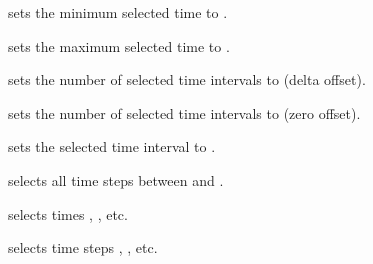  {
sets the minimum selected time to .
}

 {
sets the maximum selected time to .
}

 {
sets the number of selected time intervals to  (delta
offset).
}

 {
sets the number of selected time intervals to  (zero
offset).
}

 {
sets the selected time interval to .
}

 {
selects all time steps between  and .
}

\ifx\PROGRAM\ALGEBRA \newpage \fi %
 {
selects times , , etc.
}

 {
selects time steps \param{n$_{1}$}, , etc.
}
